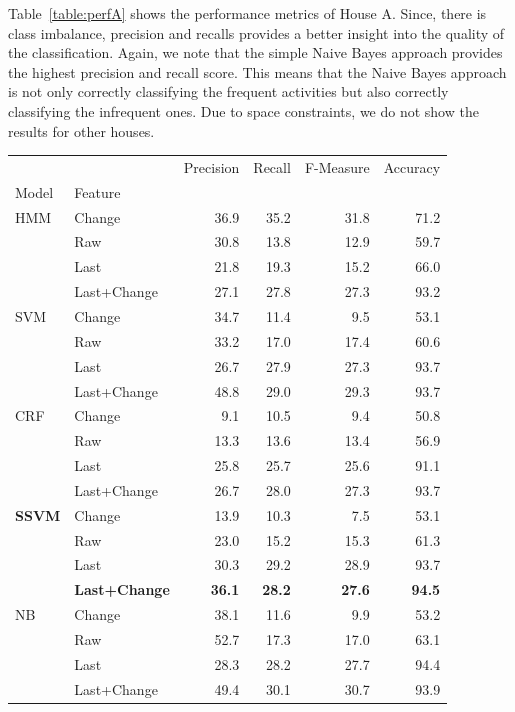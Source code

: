 Table~\ref{table:perfA} shows the performance metrics of House A. Since, there is class imbalance, precision and recalls provides a better insight into the quality of the classification. Again, we note that the simple Naive Bayes approach provides the highest precision and recall score.
This means that the Naive Bayes approach is not only correctly classifying the frequent activities but also correctly classifying the infrequent ones. Due to space constraints, we do not show the results for other houses.


\begin{centering}
\label{table:perfA}
\begin{tabular}{llrrrr}
\toprule
    &        &  Precision &  Recall &  F-Measure &  Accuracy \\
Model & Feature &            &         &            &           \\
\midrule
HMM & Change &       36.9 &    35.2 &       31.8 &      71.2 \\
    & Raw &       30.8 &    13.8 &       12.9 &      59.7 \\
    & Last &       21.8 &    19.3 &       15.2 &      66.0 \\
    & Last+Change &       27.1 &    27.8 &       27.3 &      93.2 \\
SVM & Change &       34.7 &    11.4 &        9.5 &      53.1 \\
    & Raw &       33.2 &    17.0 &       17.4 &      60.6 \\
    & Last &       26.7 &    27.9 &       27.3 &      93.7 \\
    & Last+Change &       48.8 &    29.0 &       29.3 &      93.7 \\
CRF & Change &        9.1 &    10.5 &        9.4 &      50.8 \\
    & Raw &       13.3 &    13.6 &       13.4 &      56.9 \\
    & Last &       25.8 &    25.7 &       25.6 &      91.1 \\
    & Last+Change &       26.7 &    28.0 &       27.3 &      93.7 \\
\textbf{SSVM} & Change &       13.9 &    10.3 &        7.5 &      53.1 \\
    & Raw &       23.0 &    15.2 &       15.3 &      61.3 \\
    & Last &       30.3 &    29.2 &       28.9 &      93.7 \\
	& \textbf{Last+Change} &       \textbf{36.1} &    \textbf{28.2} &       \textbf{27.6} &      \textbf{94.5} \\
NB & Change &       38.1 &    11.6 &        9.9 &      53.2 \\
    & Raw &       52.7 &    17.3 &       17.0 &      63.1 \\
    & Last &       28.3 &    28.2 &       27.7 &      94.4 \\
    & Last+Change &       49.4 &    30.1 &       30.7 &      93.9 \\
\bottomrule
\end{tabular}
\end{centering}
\vspace{1cm}

